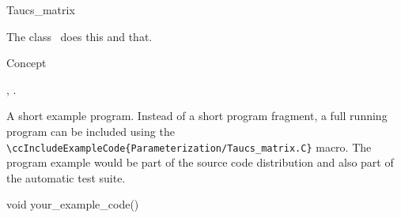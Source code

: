 

\begin{ccRefClass}{Taucs_matrix}  %


\ccDefinition
  
The class \ccRefName\ does this and that.


\ccIsModel

Concept

\ccTypes


\ccCreation
{}  %


\ccOperations


\ccSeeAlso

,
.

\ccExample

A short example program.
Instead of a short program fragment, a full running program can be
included using the 
\verb|\ccIncludeExampleCode{Parameterization/Taucs_matrix.C}| 
macro. The program example would be part of the source code distribution and
also part of the automatic test suite.

\begin{ccExampleCode}
void your_example_code() {
}
\end{ccExampleCode}


\end{ccRefClass}


